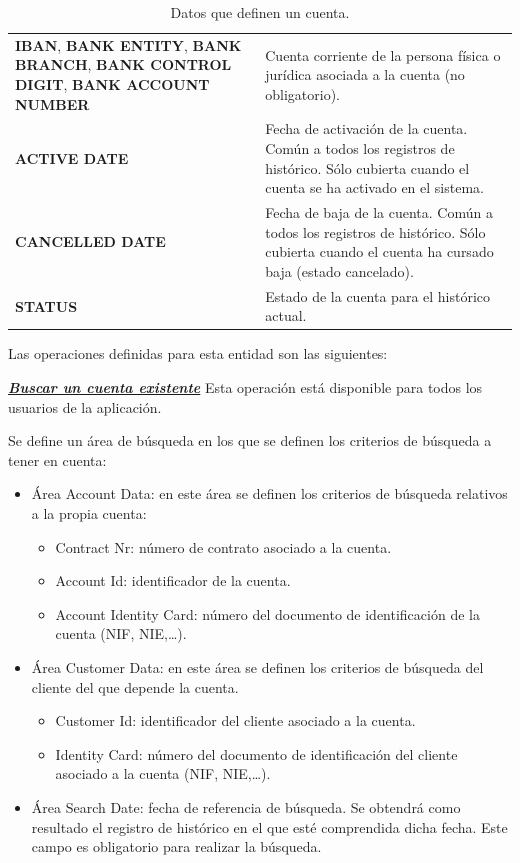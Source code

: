 \begin{table}[H]
{\begin{tabular}{|m{6cm} m{8cm}|}
	\textbf{IBAN}, \textbf{BANK ENTITY}, \textbf{BANK BRANCH}, \textbf{BANK CONTROL DIGIT}, \textbf{BANK ACCOUNT NUMBER} & Cuenta corriente de la persona física o jurídica asociada a la cuenta (no obligatorio).\\
	\textbf{ACTIVE DATE} & Fecha de activación de la cuenta. Común a todos los registros de histórico. Sólo cubierta cuando el cuenta se ha activado en el sistema.\\	
	\textbf{CANCELLED DATE} & Fecha de baja de la cuenta. Común a todos los registros de histórico. Sólo cubierta cuando el cuenta ha cursado baja (estado cancelado).	\\
	\textbf{STATUS} & Estado de la cuenta para el histórico actual.	
	\\\hline
  \end{tabular}
  } %
  \caption{Datos que definen un cuenta.}
  \label{tab:cuenta}
\end{table}



Las operaciones definidas para esta entidad son las siguientes:


\underline{\textsl{\textbf{Buscar un cuenta existente}}}\newline
Esta operación está disponible para todos los usuarios de la aplicación.

Se define un área de búsqueda en los que se definen los criterios de búsqueda a tener en cuenta:

\begin{itemize}
	\item Área Account Data: en este área se definen los criterios de búsqueda relativos a la propia cuenta:
	\begin{itemize}
		\item Contract Nr: número de contrato asociado a la cuenta.
		\item Account Id: identificador de la cuenta.
		\item Account Identity Card: número del documento de identificación de la cuenta (NIF, NIE,\dots).
	\end{itemize}
	\item Área Customer Data: en este área se definen los criterios de búsqueda del cliente del que depende la cuenta.
	\begin{itemize}
		\item Customer Id: identificador del cliente asociado a la cuenta.
		\item Identity Card: número del documento de identificación del cliente asociado a la cuenta (NIF, NIE,\dots).
	\end{itemize}
	\item Área Search Date: fecha de referencia de búsqueda. Se obtendrá como resultado el registro de histórico en el que esté comprendida dicha fecha. Este campo es obligatorio para realizar la búsqueda.
\end{itemize}

